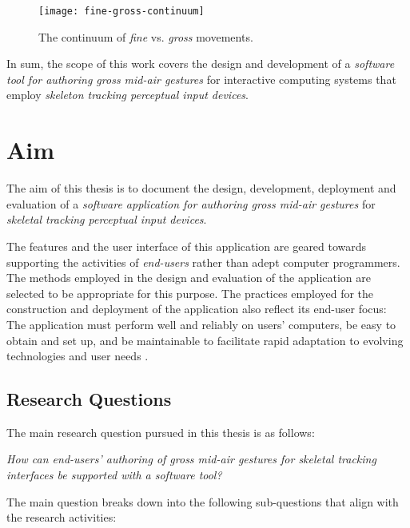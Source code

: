 \begin{figure}[ht]
\centering
\texttt{[image: fine-gross-continuum]}
\caption{The continuum of \emph{fine} vs. \emph{gross} movements.}
\label{fig:fine-gross-continuum}
\end{figure}

In sum, the scope of this work covers the design and development of a \emph{software tool for authoring gross mid-air gestures} for interactive computing systems that employ \emph{skeleton tracking perceptual input devices}.

\section{Aim} %

The aim of this thesis is to document the design, development, deployment and evaluation of a \emph{software application for authoring gross mid-air gestures} for \emph{skeletal tracking perceptual input devices}.

The features and the user interface of this application are geared towards supporting the activities of \emph{end-users} rather than adept computer programmers. The methods employed in the design and evaluation of the application are selected to be appropriate for this purpose. The practices employed for the construction and deployment of the application also reflect its end-user focus: The application must perform well and reliably on users' computers, be easy to obtain and set up, and be maintainable to facilitate rapid adaptation to evolving technologies and user needs \parencite{McConnell:2009, Brooks:1995}.

\subsection{Research Questions} %

The main research question pursued in this thesis is as follows:

\begin{center}
\emph{How can end-users' authoring of gross mid-air gestures for skeletal tracking interfaces be supported with a software tool?}
\end{center}

The main question breaks down into the following sub-questions that align with the research activities:

